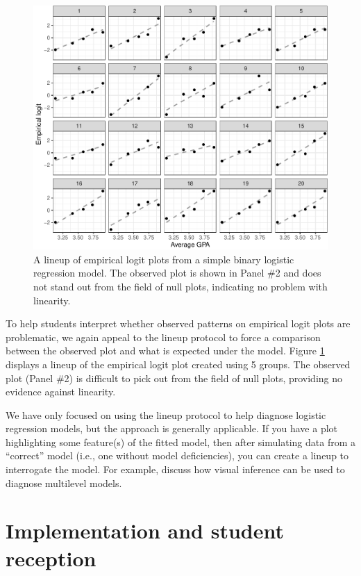 \documentclass[12pt]{article}
\begin{document}
\begin{figure}
\centering
\includegraphics{vizinf-paper_files/figure-latex/unnamed-chunk-8-1.pdf}
\caption{\label{fig:emplogitlineup} A lineup of empirical logit plots
from a simple binary logistic regression model. The observed plot is
shown in Panel \#2 and does not stand out from the field of null plots,
indicating no problem with linearity.}
\end{figure}

To help students interpret whether observed patterns on empirical logit
plots are problematic, we again appeal to the lineup protocol to force a
comparison between the observed plot and what is expected under the
model. Figure \ref{fig:emplogitlineup} displays a lineup of the
empirical logit plot created using 5 groups. The observed plot (Panel
\#2) is difficult to pick out from the field of null plots, providing no
evidence against linearity.

We have only focused on using the lineup protocol to help diagnose
logistic regression models, but the approach is generally applicable. If
you have a plot highlighting some feature(s) of the fitted model, then
after simulating data from a ``correct'' model (i.e., one without model
deficiencies), you can create a lineup to interrogate the model. For
example, \cite{Loy2017-fo} discuss how visual inference can be used to
diagnose multilevel models.

\hypertarget{implementation-and-student-reception}{%
\section{Implementation and student
reception}\label{implementation-and-student-reception}}
\end{document}
